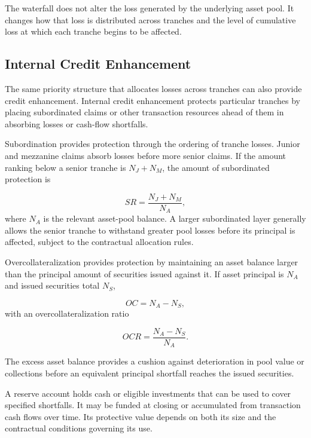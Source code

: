 The waterfall does not alter the loss generated by the underlying asset pool. It changes how that loss is distributed across tranches and the level of cumulative loss at which each tranche begins to be affected.

\subsection{Internal Credit Enhancement}

The same priority structure that allocates losses across tranches can also provide credit enhancement. Internal credit enhancement protects particular tranches by placing subordinated claims or other transaction resources ahead of them in absorbing losses or cash-flow shortfalls.

Subordination provides protection through the ordering of tranche losses. Junior and mezzanine claims absorb losses before more senior claims. If the amount ranking below a senior tranche is \(N_J+N_M\), the amount of subordinated protection is

\begin{equation}
SR
=
\frac{N_J+N_M}{N_A},
\label{eq:ch20-subordination-ratio}
\end{equation}
where \(N_A\) is the relevant asset-pool balance. A larger subordinated layer generally allows the senior tranche to withstand greater pool losses before its principal is affected, subject to the contractual allocation rules.

Overcollateralization provides protection by maintaining an asset balance larger than the principal amount of securities issued against it. If asset principal is \(N_A\) and issued securities total \(N_S\),

\begin{equation}
OC
=
N_A-N_S,
\label{eq:ch20-overcollateralization}
\end{equation}
with an overcollateralization ratio

\begin{equation}
OCR
=
\frac{N_A-N_S}{N_A}.
\label{eq:ch20-overcollateralization-ratio}
\end{equation}

The excess asset balance provides a cushion against deterioration in pool value or collections before an equivalent principal shortfall reaches the issued securities.

A reserve account holds cash or eligible investments that can be used to cover specified shortfalls. It may be funded at closing or accumulated from transaction cash flows over time. Its protective value depends on both its size and the contractual conditions governing its use.

